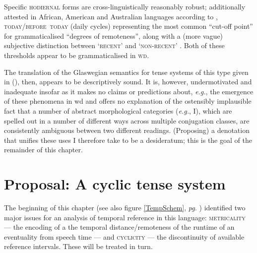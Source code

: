 
Specific \textsc{hodiernal} forms are cross-linguistically reasonably robust; additionally attested in African, American and Australian languages according to \citet[87]{Comrie1985}, \textsc{today/before~today} (daily cycles) representing the most common ``cut-off point'' for grammaticalised ``degrees of remoteness'', along with a (more vague) subjective distinction between `\textsc{recent}' and \textsc{`non-recent'} \citep[see also][]{Botne2012}. Both of these thresholds appear to be grammaticalised in \textsc{wd}.

The translation of the Glaswegian semantics for tense systems of this type given in (), then, appears to be descriptively sound. It is, however, undermotivated and inadequate insofar as it makes no claims or predictions about, \textit{e.g.}, the emergence of these phenomena in \gls{wd} and offers no explanation of the ostensibly implausible fact that a number of abstract morphological categories (\textit{e.g.}, \gls{I}), which are spelled out in a number of different ways across multiple conjugation classes, are consistently ambiguous between two different readings. (Proposing) a denotation that unifies these uses I therefore take to be a desideratum; this is the goal of the remainder of this chapter.

\section{Proposal: A cyclic tense system}\label{sec:cyc}

The beginning of this chapter (see also figure \ref{TempSchem}, \textit{pg.} \pageref{TempSchem}) identified two major issues for an analysis of temporal reference in this language: \textsc{metricality} --- the encoding of a the temporal distance/remoteness of the runtime of an eventuality from speech time  --- and \textsc{cyclicity} --- the discontinuity of available reference intervals. These will be treated in turn.

